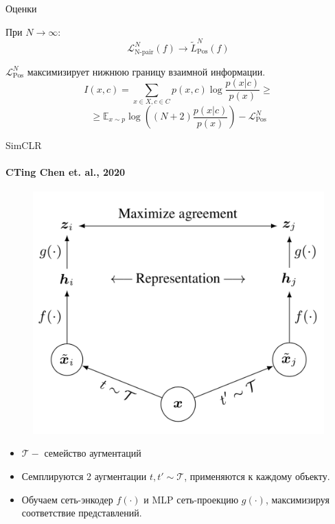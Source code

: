 \documentclass{beamer}
\begin{document}
\begin{frame}{Оценки}
\begin{lemma}
При $N \to \infty$:
$$\mathcal{L}_{\text{N-pair}}^N(f) \to \tilde{L}_{\text{Pos}}^N (f)$$
\end{lemma}

\begin{theorem}
$\mathcal{L}_{\text{Pos}}^N$ максимизирует нижнюю границу взаимной информации.
$$I(x, c) = \sum\limits_{x \in X, c \in C}p(x, c)\log \frac{p(x|c)}{p(x)} \geq$$
$$\geq \mathbb{E}_{x \sim p}\log\left((N + 2)\frac{p(x|c)}{p(x)}\right) - \mathcal{L}_{\text{Pos}}^N$$
\end{theorem}
\end{frame}
\begin{frame}{SimCLR}
\framesubtitle{CTing Chen et. al., 2020} %

\begin{figure}
    \includegraphics[width=0.5\linewidth]{Presentation/SimCLR.png}
\end{figure}

\scriptsize
\begin{itemize}
    \item $\mathcal{T} -$ семейство аугментаций
    \item Семплируются 2 аугментации $t, t' \sim \mathcal{T}$, применяются к каждому объекту.
    \item Обучаем сеть-энкодер $f(\cdot)$ и MLP сеть-проекцию $g(\cdot)$, максимизируя соответствие представлений.
\end{itemize}
\end{frame}
\end{document}
